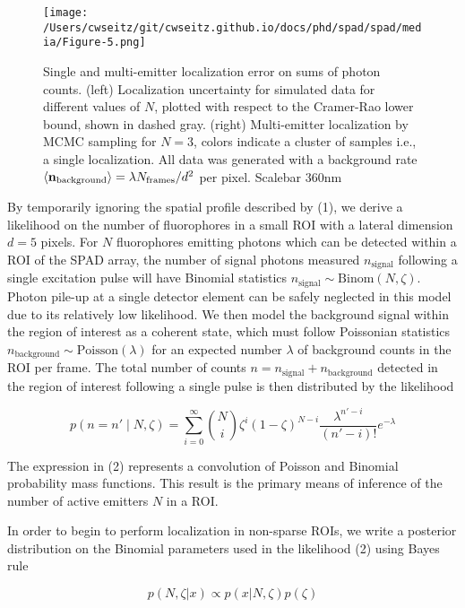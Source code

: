 \begin{figure*}[t]
\centering
\texttt{[image: /Users/cwseitz/git/cwseitz.github.io/docs/phd/spad/spad/media/Figure-5.png]}
\caption{Single and multi-emitter localization error on sums of photon counts. (left) Localization uncertainty for simulated data for different values of $N$, plotted with respect to the Cramer-Rao lower bound, shown in dashed gray. (right) Multi-emitter localization by MCMC sampling for $N=3$, colors indicate a cluster of samples i.e., a single localization. All data was generated with a background rate $\langle \bold{n}_{\mathrm{background}} \rangle = \lambda N_{\mathrm{frames}}/d^{2}$ per pixel. Scalebar 360nm}
\end{figure*}   

By temporarily ignoring the spatial profile described by (1), we derive a likelihood on the number of fluorophores in a small ROI with a lateral dimension $d = 5$ pixels. For $N$ fluorophores emitting photons which can be detected within a ROI of the SPAD array, the number of signal photons measured $n_{\mathrm{signal}}$ following a single excitation pulse will have Binomial statistics $n_{\mathrm{signal}} \sim \mathrm{Binom}(N,\zeta)$. Photon pile-up at a single detector element can be safely neglected in this model due to its relatively low likelihood. We then model the background signal within the region of interest as a coherent state, which must follow Poissonian statistics $n_{\mathrm{background}} \sim \mathrm{Poisson}(\lambda)$ for an expected number $\lambda$ of background counts in the ROI per frame. The total number of counts $n=n_{\mathrm{signal}}+n_{\mathrm{background}}$ detected in the region of interest following a single pulse is then distributed by the likelihood

\begin{equation}
p(n=n' \mid N, \zeta) = \sum_{i=0}^{\infty} \binom{N}{i} \zeta^i (1-\zeta)^{N-i} \frac{\lambda^{n'-i}}{(n'-i)!} e^{-\lambda}
\end{equation}

The expression in (2) represents a convolution of Poisson and Binomial probability mass functions. This result is the primary means of inference of the number of active emitters $N$ in a ROI.

In order to begin to perform localization in non-sparse ROIs, we write a posterior distribution on the Binomial parameters used in the likelihood (2) using Bayes rule

\begin{equation}
p(N,\zeta\lvert x) \propto p(x\lvert N,\zeta)p(\zeta)
\end{equation}

